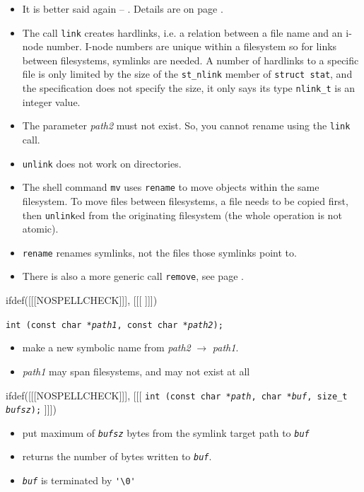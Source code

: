 \begin{itemize}
\item It is better said again -- .  Details are on page \pageref{FILEDELETE}.
\item The call \texttt{link} creates hardlinks, i.e. a relation between a file
name and an i-node number.  I-node numbers are unique within a filesystem so for
links between filesystems, symlinks are needed.  A number of hardlinks to a
specific file is only limited by the size of the \texttt{st\_nlink} member of
\texttt{struct stat}, and the specification does not specify the size, it only
says its type \texttt{nlink\_t} is an integer value.
\item The parameter \emph{path2} must not exist.  So, you cannot rename using
the \texttt{link} call.
\item \texttt{unlink} does not work on directories.
\item The shell command \texttt{mv} uses \texttt{rename} to move objects within
the same filesystem.  To move files between filesystems, a file needs to be
copied first, then \texttt{unlink}ed from the originating filesystem (the whole
operation is not atomic).
\item \texttt{rename} renames symlinks, not the files those symlinks point to.
\item There is also a more generic call \texttt{remove}, see page
\pageref{REMOVE}.
\end{itemize}


ifdef([[[NOSPELLCHECK]]], [[[
]]])

\begin{slide}
\texttt{int (const char *\emph{path1},
const char *\emph{path2});} 
\begin{itemize}
\item make a new symbolic name from \emph{path2} $\rightarrow$ \emph{path1}.
\item \emph{path1} may span filesystems, and may not exist at all
\end{itemize}
ifdef([[[NOSPELLCHECK]]], [[[
\texttt{int (const char *\emph{path}, char *\emph{buf},
size\_t \emph{bufsz});} 
]]])
\begin{itemize}
\item put maximum of \emph{\texttt{bufsz}} bytes from the symlink target path
to \texttt{\emph{buf}}
\item returns the number of bytes written to \texttt{\emph{buf}}.
\item \texttt{\emph{buf}} is  terminated by \verb#'\0'#
\end{itemize}
\end{slide}

